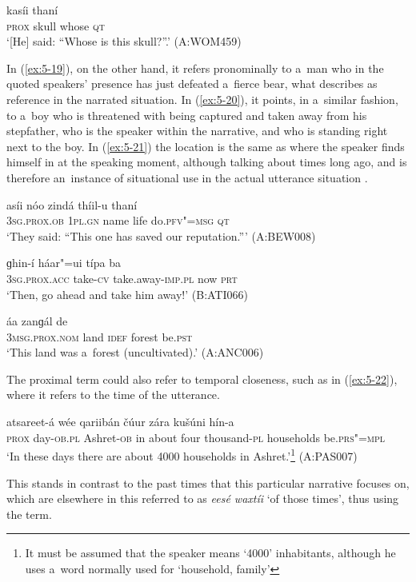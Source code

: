 \begin{exe}
\ex
\label{ex:5-18}
 kasíi thaní \\
\textsc{prox} skull whose \textsc{qt} \\
\glt `[He] said: ``Whose is this skull?''.' (A:WOM459)
\end{exe}
In (\ref{ex:5-19}), on the other hand, it refers pronominally to a~man who in the quoted speakers' presence has just defeated a~fierce bear, what \citet[222]{himmelmann1996} describes as reference in the narrated situation. In (\ref{ex:5-20}), it points, in a~similar fashion, to a~boy who is threatened with being captured and taken away from his stepfather, who is the speaker within the narrative, and who is standing right next to the boy. In (\ref{ex:5-21}) the location is the same as where the speaker finds himself in at the speaking moment, although talking about times long ago, and is therefore an~instance of situational use in the actual utterance situation \citep[222]{himmelmann1996}.

\begin{exe}
\ex
\label{ex:5-19}
\gll [aníi] asíi nóo zindá thíil-u thaní \\
\textsc{3sg.prox.ob} \textsc{1pl.gn} name life do.\textsc{pfv"=msg} \textsc{qt} \\
\glt `They said: ``This one has saved our reputation.''' (A:BEW008)

\ex
\label{ex:5-20}
\gll [hanís] ɡhin-í háar"=ui típa ba \\
\textsc{3sg.prox.acc} take-\textsc{cv} take.away-\textsc{imp.pl} now \textsc{prt} \\
\glt `Then, go ahead and take him away!' (B:ATI066)

\ex
\label{ex:5-21}
 áa zanɡál de \\
\textsc{3msg.prox.nom} land \textsc{idef} forest be.\textsc{pst} \\
\glt `This land was a~forest (uncultivated).' (A:ANC006)
\end{exe}
The proximal term could also refer to temporal closeness, such as in (\ref{ex:5-22}), where it refers to the time of the utterance.

\begin{exe}
\ex
\label{ex:5-22}
 atsareet-á wée qariibán čúur zára kušúni
hín-a \\
\textsc{prox} day-\textsc{ob.pl} Ashret-\textsc{ob} in about four thousand-\textsc{pl} households
be.\textsc{prs"=mpl} \\
\glt `In these days there are about 4000 households in Ashret.'\footnote{It must be assumed that the speaker means `4000' inhabitants, although he uses a~word normally used for `household, family'} (A:PAS007)
\end{exe}
This stands in contrast to the past times that this particular narrative focuses on, which are elsewhere in this  referred to as \textit{eesé waxtíi} `of those times', thus using the  term.

